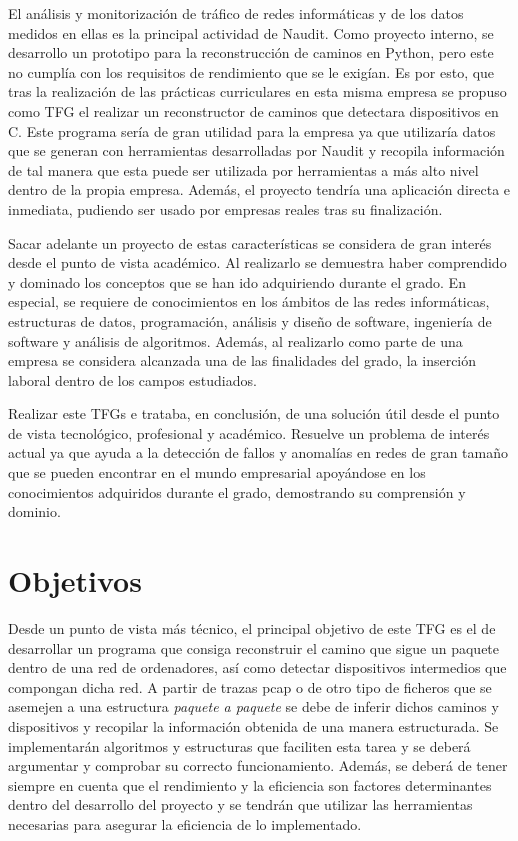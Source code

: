 \documentclass[tfg,epsbased,lof,lot,loa,final,nocopyright,overleaf]{tfgtfmthesisuam}
\begin{document}
El análisis y monitorización de tráfico de redes informáticas y de los datos medidos en ellas es la principal actividad de Naudit. Como proyecto interno, se desarrollo un prototipo para la reconstrucción de caminos en Python, pero este no cumplía con los requisitos de rendimiento que se le exigían. Es por esto, que tras la realización de las prácticas curriculares en esta misma empresa se propuso como TFG el realizar un reconstructor de caminos que detectara dispositivos en C. Este programa sería de gran utilidad para la empresa ya que utilizaría datos que se generan con herramientas desarrolladas por Naudit y recopila información de tal manera que esta puede ser utilizada por herramientas a más alto nivel dentro de la propia empresa. Además, el proyecto tendría una aplicación directa e inmediata, pudiendo ser usado por empresas reales tras su finalización.

Sacar adelante un proyecto de estas características se considera de gran interés desde el punto de vista académico. Al realizarlo se demuestra haber comprendido y dominado los conceptos que se han ido adquiriendo durante el grado. En especial, se requiere de conocimientos en los ámbitos de las redes informáticas, estructuras de datos, programación, análisis y diseño de software, ingeniería de software y análisis de algoritmos. Además, al realizarlo como parte de una empresa se considera alcanzada una de las finalidades del grado, la inserción laboral dentro de los campos estudiados. 

Realizar este TFGs e trataba, en conclusión, de una solución útil desde el punto de vista tecnológico, profesional y académico. Resuelve un problema de interés actual ya que ayuda a la detección de fallos y anomalías en redes de gran tamaño que se pueden encontrar en el mundo empresarial apoyándose en los conocimientos adquiridos durante el grado, demostrando su comprensión y dominio. 
\section{Objetivos}
Desde un punto de vista más técnico, el principal objetivo de este TFG es el de desarrollar un programa que consiga reconstruir el camino que sigue un paquete dentro de una red de ordenadores, así como detectar dispositivos intermedios que compongan dicha red. A partir de trazas pcap o de otro tipo de ficheros que se asemejen a una estructura \textit{paquete a paquete} se debe de inferir dichos caminos y dispositivos y recopilar la información obtenida de una manera estructurada. Se implementarán algoritmos y estructuras que faciliten esta tarea y se deberá argumentar y comprobar su correcto funcionamiento. Además, se deberá de tener siempre en cuenta que el rendimiento y la eficiencia son factores determinantes dentro del desarrollo del proyecto y se tendrán que utilizar las herramientas necesarias para asegurar la eficiencia de lo implementado.
\end{document}
